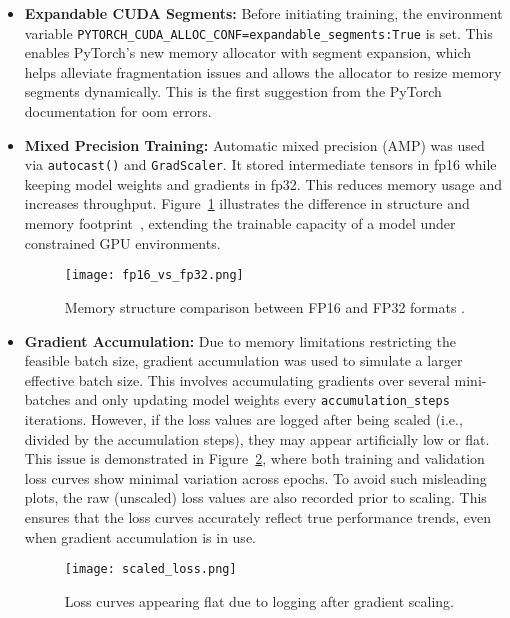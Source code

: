 \begin{itemize}
    \item \textbf{Expandable CUDA Segments:} Before initiating training, the environment variable \texttt{PYTORCH\_CUDA\_ALLOC\_CONF=expandable\_segments:True} is set. This enables PyTorch’s new memory allocator with segment expansion, which helps alleviate fragmentation issues and allows the allocator to resize memory segments dynamically. This is the first suggestion from the PyTorch documentation for \gls{oom} errors.

    \item \textbf{Mixed Precision Training:} Automatic mixed precision (AMP) was used via \texttt{autocast()} and \texttt{GradScaler}. It stored intermediate tensors in \gls{fp16} while keeping model weights and gradients in \gls{fp32}. This reduces memory usage and increases throughput. Figure~\ref{fig:fp16_vs_fp32} illustrates the difference in structure and memory footprint~\cite{mindspore_mixed_precision}, extending the trainable capacity of a model under constrained GPU environments.

    \begin{figure}[H]
        \centering
        \texttt{[image: fp16\_vs\_fp32.png]}
        \caption{Memory structure comparison between FP16 and FP32 formats \cite{mindspore_mixed_precision}.}
        \label{fig:fp16_vs_fp32}
    \end{figure}

    \item \textbf{Gradient Accumulation:} Due to memory limitations restricting the feasible batch size, gradient accumulation was used to simulate a larger effective batch size. This involves accumulating gradients over several mini-batches and only updating model weights every \texttt{accumulation\_steps} iterations. However, if the loss values are logged after being scaled (i.e., divided by the accumulation steps), they may appear artificially low or flat. This issue is demonstrated in Figure~\ref{fig:scaled_loss}, where both training and validation loss curves show minimal variation across epochs. To avoid such misleading plots, the raw (unscaled) loss values are also recorded prior to scaling. This ensures that the loss curves accurately reflect true performance trends, even when gradient accumulation is in use.

    \begin{figure}[H]
        \centering
        \texttt{[image: scaled\_loss.png]}
        \caption{Loss curves appearing flat due to logging after gradient scaling.}
        \label{fig:scaled_loss}
    \end{figure}


\end{itemize}
